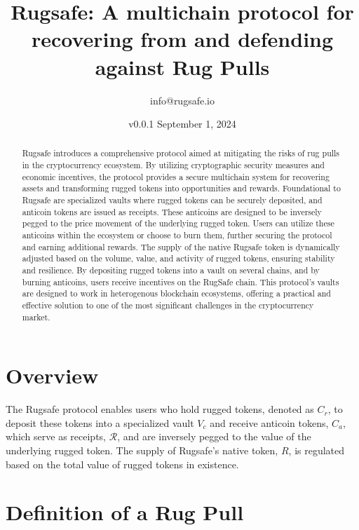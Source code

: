 \documentclass{article}
\title{Rugsafe: A multichain protocol for recovering from and defending against Rug Pulls}
\author{info@rugsafe.io}
\date{v0.0.1 September 1, 2024}
\begin{document}
\maketitle


\begin{abstract}
Rugsafe introduces a comprehensive protocol aimed at mitigating the risks of rug pulls in the cryptocurrency ecosystem. By utilizing cryptographic security measures and economic incentives, the protocol provides a secure multichain system for recovering assets and transforming rugged tokens into opportunities and rewards. Foundational to Rugsafe are specialized vaults where rugged tokens can be securely deposited, and anticoin tokens are issued as receipts. These anticoins are designed to be inversely pegged to the price movement of the underlying rugged token. Users can utilize these anticoins within the ecosystem or choose to burn them, further securing the protocol and earning additional rewards. The supply of the native Rugsafe token is dynamically adjusted based on the volume, value, and activity of rugged tokens, ensuring stability and resilience. By depositing rugged tokens into a vault on several chains, and by burning anticoins, users receive incentives on the RugSafe chain. This protocol's vaults are designed to work in heterogenous blockchain ecosystems, offering a practical and effective solution to one of the most significant challenges in the cryptocurrency market. 
\end{abstract}





\tableofcontents






\section{Overview}

The Rugsafe protocol enables users who hold rugged tokens, denoted as $C_r$, to deposit these tokens into a specialized vault $V_c$ and receive anticoin tokens, $C_a$,  which serve as receipts, \(\mathcal{R} \), and are inversely pegged to the value of the underlying rugged token. The supply of Rugsafe's native token, $R$, is regulated based on the total value of rugged tokens in existence.


\section{Definition of a Rug Pull}
\end{document}
